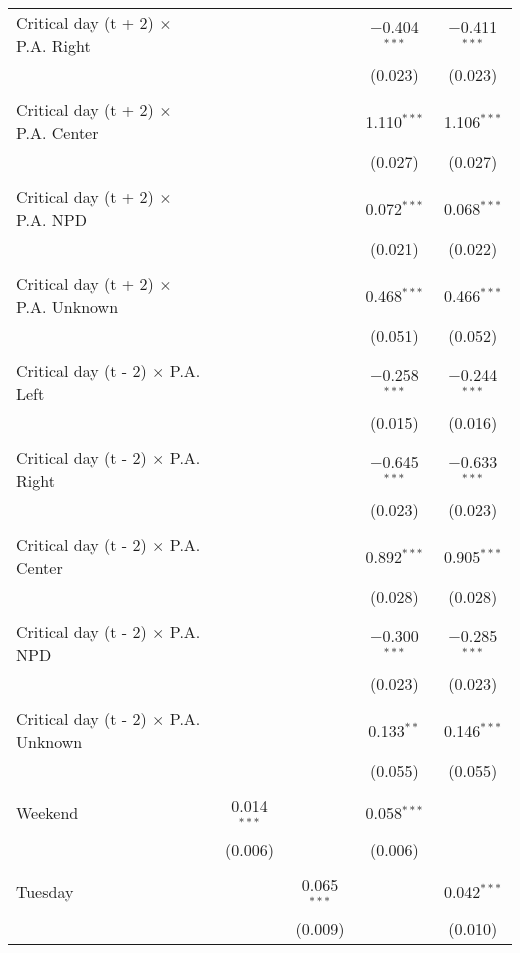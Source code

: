 \documentclass[
]{article}
\begin{document}
\begin{table}[!htbp]
{\begin{tabular}{@{\extracolsep{5pt}}lcccc}
 Critical day (t + 2) $\times$ P.A. Right &  &  & $-$0.404$^{***}$ & $-$0.411$^{***}$ \\ 
  &  &  & (0.023) & (0.023) \\ 
  & & & & \\ 
 Critical day (t + 2) $\times$ P.A. Center &  &  & 1.110$^{***}$ & 1.106$^{***}$ \\ 
  &  &  & (0.027) & (0.027) \\ 
  & & & & \\ 
 Critical day (t + 2) $\times$ P.A. NPD &  &  & 0.072$^{***}$ & 0.068$^{***}$ \\ 
  &  &  & (0.021) & (0.022) \\ 
  & & & & \\ 
 Critical day (t + 2) $\times$ P.A. Unknown &  &  & 0.468$^{***}$ & 0.466$^{***}$ \\ 
  &  &  & (0.051) & (0.052) \\ 
  & & & & \\ 
 Critical day (t - 2) $\times$ P.A. Left &  &  & $-$0.258$^{***}$ & $-$0.244$^{***}$ \\ 
  &  &  & (0.015) & (0.016) \\ 
  & & & & \\ 
 Critical day (t - 2) $\times$ P.A. Right &  &  & $-$0.645$^{***}$ & $-$0.633$^{***}$ \\ 
  &  &  & (0.023) & (0.023) \\ 
  & & & & \\ 
 Critical day (t - 2) $\times$ P.A. Center &  &  & 0.892$^{***}$ & 0.905$^{***}$ \\ 
  &  &  & (0.028) & (0.028) \\ 
  & & & & \\ 
 Critical day (t - 2) $\times$ P.A. NPD &  &  & $-$0.300$^{***}$ & $-$0.285$^{***}$ \\ 
  &  &  & (0.023) & (0.023) \\ 
  & & & & \\ 
 Critical day (t - 2) $\times$ P.A. Unknown &  &  & 0.133$^{**}$ & 0.146$^{***}$ \\ 
  &  &  & (0.055) & (0.055) \\ 
  & & & & \\ 
 Weekend & 0.014$^{***}$ &  & 0.058$^{***}$ &  \\ 
  & (0.006) &  & (0.006) &  \\ 
  & & & & \\ 
 Tuesday &  & 0.065$^{***}$ &  & 0.042$^{***}$ \\ 
  &  & (0.009) &  & (0.010) \\ 

\end{tabular}}
\end{table}
\end{document}
